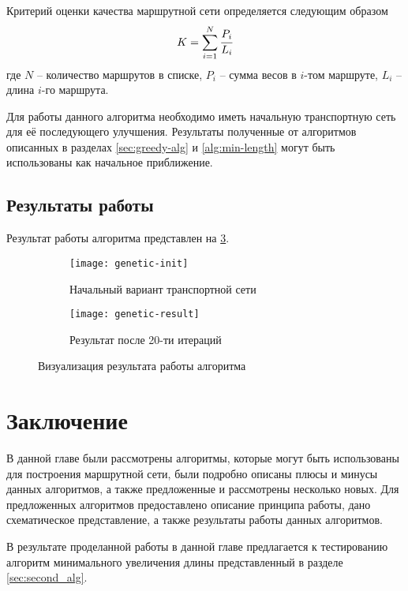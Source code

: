 Критерий оценки качества маршрутной сети определяется следующим образом
\[
    K = \sum\limits_{i=1}^{N} \cfrac{P_i}{L_i}
\]
где \( N \) -- количество маршрутов в списке, \( P_i \) -- сумма весов в \( i \)-том маршруте, 
\( L_i \) – длина \( i \)-го маршрута.

Для работы данного алгоритма необходимо иметь начальную транспортную сеть для её последующего улучшения. 
Результаты полученные от алгоритмов описанных в разделах \ref{sec:greedy-alg} и \ref{alg:min-length} могут 
быть использованы как начальное приближение.

\clearpage

\subsection{Результаты работы}
Результат работы алгоритма представлен на \ref{img:genetic-01}.
\begin{figure}[h!]
    \centering
    \begin{subfigure}{0.7\textwidth}
        \texttt{[image: genetic-init]}
        \caption{Начальный вариант транспортной сети}
        \label{fig:genetic-init}
    \end{subfigure}
    \begin{subfigure}{0.7\textwidth}
        \texttt{[image: genetic-result]}
        \caption{Результат после 20-ти итераций}
        \label{fig:genetic-result}
    \end{subfigure}
    \caption{Визуализация результата работы алгоритма}
   \label{img:genetic-01}
\end{figure}

\clearpage

\section{Заключение}
В данной главе были рассмотрены алгоритмы, которые могут быть использованы для построения маршрутной сети, 
были подробно описаны плюсы и минусы данных алгоритмов, а также предложенные и рассмотрены несколько новых. 
Для предложенных алгоритмов предоставлено описание принципа работы, дано схематическое представление, а также 
результаты работы данных алгоритмов. 

В результате проделанной работы в данной главе предлагается к тестированию алгоритм минимального увеличения 
длины представленный в разделе \ref{sec:second_alg}.
